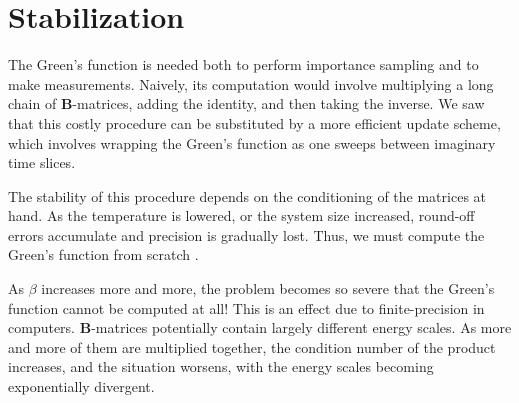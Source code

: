 \section{Stabilization}
\label{subsec:stabilization}

The Green's function is needed both to perform importance sampling and to make measurements.
Naively, its computation would involve multiplying a long chain of $\bm B$-matrices, adding the identity, and then taking the inverse.
We saw that this costly procedure can be substituted by a more efficient update scheme, which involves wrapping the Green's function as one sweeps between imaginary time slices.

The stability of this procedure depends on the conditioning of the matrices at hand.
As the temperature is lowered, or the system size increased, round-off errors accumulate and precision is gradually lost.
Thus, we must compute the Green's function from scratch .

As $\beta$ increases more and more, the problem becomes so severe that the Green's function cannot be computed at all!
This is an effect due to finite-precision in computers.
$\bm B$-matrices potentially contain largely different energy scales.
As more and more of them are multiplied together, the condition number of the product increases, and the situation worsens, with the energy scales becoming exponentially divergent.
